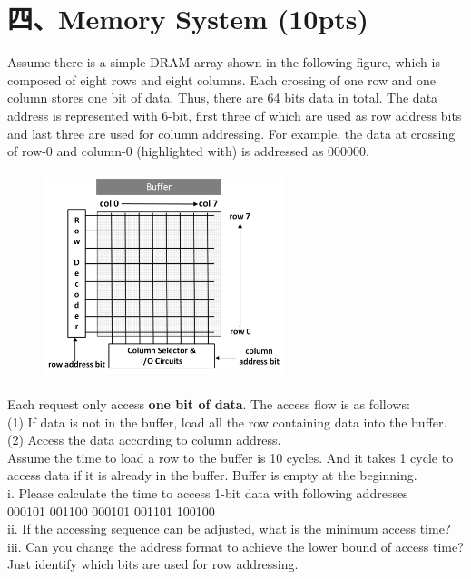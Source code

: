 \documentclass[UTF8]{ctexart}
\begin{document}
\section*{四、Memory System (10pts)}
Assume there is a simple DRAM array shown in the following figure, which is composed of eight rows and eight columns. Each crossing of one row and one column
stores one bit of data. Thus, there are 64 bits data in total. The data address is represented with 6-bit, first three of which are used as row address bits and 
last three are used for column addressing. For example, the data at crossing of row-0 and column-0 (highlighted with) is addressed as 000000.\\
\begin{figure}[H]                                            
    \centering                                                
    \includegraphics[width=7cm,height=6cm]{4-1.png}        
    \caption*{}                                                                                 
\end{figure}  
Each request only access {\bfseries one bit of data}. The access flow is as follows:\\
(1) If data is not in the buffer, load all the row containing data into the buffer.\\
(2) Access the data according to column address.\\
Assume the time to load a row to the buffer is 10 cycles. And it takes 1 cycle to access data if it is already in the buffer. Buffer is empty at the beginning.\\
i. Please calculate the time to access 1-bit data with following addresses\\
000101 001100 000101 001101 100100\\
ii. If the accessing sequence can be adjusted, what is the minimum access time?\\
iii. Can you change the address format to achieve the lower bound of access time? Just identify which bits are used for row addressing.\\
\end{document}
